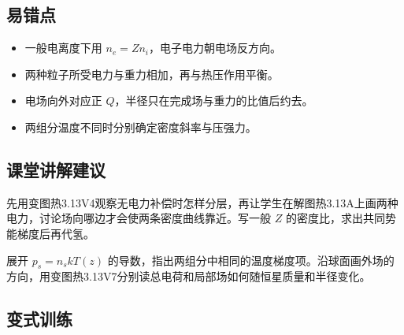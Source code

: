 \documentclass[UTF8,fontset=fandol,a4paper,11pt]{ctexart}
\begin{document}

\subsection*{易错点}

\begin{itemize}
\item 一般电离度下用 $n_e=Zn_i$，电子电力朝电场反方向。
\item 两种粒子所受电力与重力相加，再与热压作用平衡。
\item 电场向外对应正 $Q$，半径只在完成场与重力的比值后约去。
\item 两组分温度不同时分别确定密度斜率与压强力。
\end{itemize}



\subsection*{课堂讲解建议}

先用变图热3.13V4观察无电力补偿时怎样分层，再让学生在解图热3.13A上画两种电力，讨论场向哪边才会使两条密度曲线靠近。写一般 $Z$ 的密度比，求出共同势能梯度后再代氢。

展开 $p_s=n_s kT(z)$ 的导数，指出两组分中相同的温度梯度项。沿球面画外场的方向，用变图热3.13V7分别读总电荷和局部场如何随恒星质量和半径变化。



\subsection*{变式训练}
\end{document}
